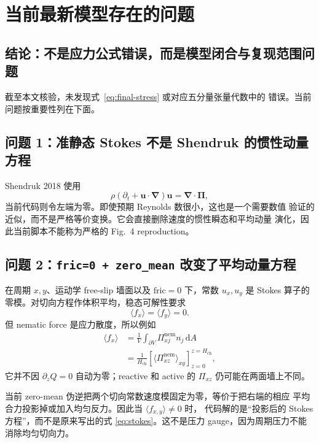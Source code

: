 \documentclass[UTF8,11pt,a4paper]{ctexart}
\newcommand{\dd}{\,\mathrm d}
\begin{document}
\section{当前最新模型存在的问题}
\label{sec:problems}

\subsection{结论：不是应力公式错误，而是模型闭合与复现范围问题}

截至本文核验，未发现式~\eqref{eq:final-stress} 或对应五分量张量代数中的
错误。当前问题按重要性列在下面。

\subsection{问题 1：准静态 Stokes 不是 Shendruk 的惯性动量方程}

Shendruk 2018 使用
\begin{equation}
  \rho(\partial_t+\bm u\!\cdot\!\bm\nabla)\bm u
  =\bm\nabla\!\cdot\bm\Pi,
\end{equation}
当前代码则令左端为零。即使预期 Reynolds 数很小，这也是一个需要数值
验证的近似，而不是严格等价变换。它会直接删除速度的惯性瞬态和平均动量
演化，因此当前脚本不能称为严格的 Fig.~4 reproduction。

\subsection{问题 2：\texttt{fric=0 + zero\_mean} 改变了平均动量方程}

在周期 $x,y$、运动学 free-slip 墙面以及 $\mathrm{fric}=0$ 下，常数
$u_x,u_y$ 是 Stokes 算子的零模。对切向方程作体积平均，稳态可解性要求
\begin{equation}
  \langle f_x\rangle=\langle f_y\rangle=0.
\end{equation}
但 nematic force 是应力散度，所以例如
\begin{equation}
\begin{aligned}
\langle f_x\rangle
&=\frac{1}{V}\int_{\partial V}\Pi^{\mathrm{nem}}_{xj}n_j\dd A\\
&=\frac{1}{H_{\mathrm{ch}}}
\left[
\langle\Pi^{\mathrm{nem}}_{xz}\rangle_{xy}
\right]_{z=0}^{z=H_{\mathrm{ch}}},
\end{aligned}
\end{equation}
它并不因 $\partial_zQ=0$ 自动为零；reactive 和 active 的
$\Pi_{xz}$ 仍可能在两面墙上不同。

当前 zero-mean 伪逆把两个切向常数速度模固定为零，等价于把右端的相应
平均合力投影掉或加入均匀反力。因此当 $\langle f_{x,y}\rangle\ne0$ 时，
代码解的是“投影后的 Stokes 方程”，而不是原来写出的式
\eqref{eq:stokes}。这不是压力 gauge，因为周期压力不能消除均匀切向力。
\end{document}
